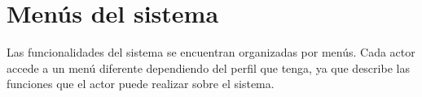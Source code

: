 \documentclass[10pt]{book}
\begin{document}
	\section{Menús del sistema}
	
	Las funcionalidades del sistema se encuentran organizadas por menús. Cada actor accede a un menú diferente dependiendo del perfil que tenga, ya que describe las funciones que el actor puede realizar sobre el sistema.
	

	
%	
	
\end{document}
